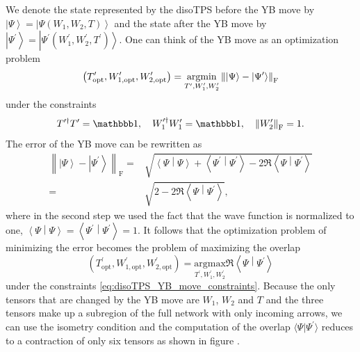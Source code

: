 We denote the state represented by the disoTPS before the YB move by $\left|\Psi\right\rangle = \left|\Psi\left(W_1, W_2, T\right)\right\rangle$ and the state after the YB move by $\left|\Psi^\prime\right\rangle = \left|\Psi^\prime\left(W_1^\prime, W_2^\prime, T^\prime\right)\right\rangle$. One can think of the YB move as an optimization problem
\begin{equation}
	\label{eq:disoTPS_YB_move_standard}
	\left(T^\prime_\text{opt},W_{1,\text{opt}}^\prime,W_{2,\text{opt}}^\prime\right) = \underset{T^\prime,W_1^\prime,W_2^\prime}{\operatorname{argmin}}\left\lVert \left|\Psi\right\rangle - \left|\Psi^\prime\right\rangle\right\rVert_\text{F}
\end{equation}
under the constraints
\begin{equation}
	\label{eq:disoTPS_YB_move_constraints}
	T^{\prime\dagger}T^\prime = \id, \quad W_1^{\prime\dagger}W_1^\prime = \id, \quad \left\lVert W_2^\prime \right\rVert_\text{F} = 1.
\end{equation}
The error of the YB move can be rewritten as
\begin{equation}
	\label{eq:disoTPS_YB_move_rewritten_error}
	\begin{split}
		\left\lVert \left|\Psi\right\rangle - \left|\Psi^\prime\right\rangle \right\rVert_\text{F} =& \sqrt{\left\langle\Psi\middle|\Psi\right\rangle + \left\langle\Psi^\prime\middle|\Psi^\prime\right\rangle - 2\Re\left\langle\Psi\middle|\Psi^\prime\right\rangle} \\
		=& \sqrt{2 - 2\Re\left\langle\Psi\middle|\Psi^\prime\right\rangle},
	\end{split}
\end{equation}
where in the second step we used the fact that the wave function is normalized to one, $\left\langle\Psi\middle|\Psi\right\rangle = \left\langle\Psi^\prime\middle|\Psi^\prime\right\rangle = 1$. It follows that the optimization problem of minimizing the error becomes the problem of maximizing the overlap
\begin{equation}
	\label{eq:disoTPS_YB_move_alternative_formulation}
	\left(T^\prime_\text{opt},W_{1,\text{opt}}^\prime,W_{2,\text{opt}}^\prime\right) = \underset{T^\prime,W_1^\prime,W_2^\prime}{\text{argmax}}\Re\left\langle\Psi\middle|\Psi^\prime\right\rangle
\end{equation}
under the constraints \eqref{eq:disoTPS_YB_move_constraints}. Because the only tensors that are changed by the YB move are $W_1$, $W_2$ and $T$ and the three tensors make up a subregion of the full network with only incoming arrows, we can use the isometry condition and the computation of the overlap $\langle\Psi|\Psi^\prime\rangle$ reduces to a contraction of only six tensors as shown in figure .\par
